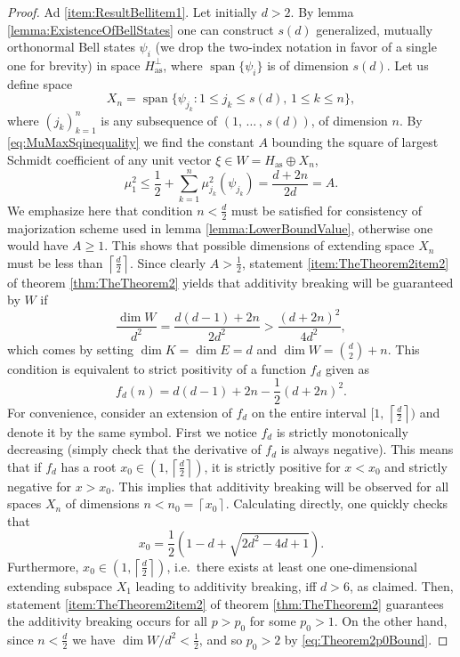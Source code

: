 \documentclass[reqno]{amsart}
\theoremstyle{plain}
\theoremstyle{note}
\newcommand{\ceil}[1]{\left\lceil #1 \right\rceil}
\newcommand{\aspace}{H_{\mathrm{as}}}
\newcommand{\Span}{\operatorname{span}}
\begin{document}
\begin{proof}
Ad \ref{item:ResultBellitem1}. Let initially $d > 2$. By lemma \ref{lemma:ExistenceOfBellStates} one can construct $s(d)$ generalized, mutually orthonormal Bell states $\psi_i$ (we drop the two-index notation in favor of a single one for brevity) in space $\aspace^\perp$, where $\Span{\{\psi_i\}}$ is of dimension $s(d)$. Let us define space
\begin{equation}
    X_n = \Span{\{\psi_{j_k} : 1 \leqslant j_k \leqslant s(d), \, 1 \leqslant k \leqslant n\}},
\end{equation}
where $(j_k)_{k=1}^{n}$ is any subsequence of $(1, \, \ldots \, , \, s(d))$, of dimension $n$. By \eqref{eq:MuMaxSqinequality} we find the constant $A$ bounding the square of largest Schmidt coefficient of any unit vector $\xi\in W = \aspace \oplus X_n$,
\begin{equation}
    \mu_{1}^{2} \leqslant \frac{1}{2} + \sum_{k=1}^{n} \mu_{j_{k}}^{2} (\psi_{j_{k}}) = \frac{d+2n}{2d} = A.
\end{equation}
We emphasize here that condition $n < \frac{d}{2}$ must be satisfied for consistency of majorization scheme used in lemma \ref{lemma:LowerBoundValue}, otherwise one would have $A \geqslant 1$. This shows that possible dimensions of extending space $X_n$ must be less than $\ceil{\frac{d}{2}}$. Since clearly $A > \frac{1}{2}$, statement \ref{item:TheTheorem2item2} of theorem \ref{thm:TheTheorem2} yields that additivity breaking will be guaranteed by $W$ if
\begin{equation}\label{eq:Bell}
    \frac{\dim{W}}{d^2} = \frac{d(d-1)+2n}{2d^2} > \frac{(d+2n)^2}{4d^2},
\end{equation}
which comes by setting $\dim{K}=\dim{E}=d$ and $\dim{W} = \binom{d}{2}+n$. This condition is equivalent to strict positivity of a function $f_{d}$ given as
\begin{equation}
    f_{d}(n) = d(d-1)+2n - \frac{1}{2}(d+2n)^{2}.
\end{equation}
For convenience, consider an extension of $f_{d}$ on the entire interval $[1, \, \ceil{\frac{d}{2}})$ and denote it by the same symbol. First we notice $f_{d}$ is strictly monotonically decreasing (simply check that the derivative of $f_d$ is always negative). This means that if $f_{d}$ has a root $x_0 \in (1, \ceil{\frac{d}{2}})$, it is strictly positive for $x < x_0$ and strictly negative for $x > x_0$. This implies that additivity breaking will be observed for all spaces $X_n$ of dimensions $n < n_0 = \ceil{x_0}$. Calculating directly, one quickly checks that
\begin{equation}
    x_0 = \frac{1}{2}\left(1-d+\sqrt{2d^2-4d+1}\right).
\end{equation}
Furthermore, $x_0 \in (1, \ceil{\frac{d}{2}})$, i.e.~there exists at least one one-dimensional extending subspace $X_1$ leading to additivity breaking, iff $d > 6$, as claimed. Then, statement \ref{item:TheTheorem2item2} of theorem \ref{thm:TheTheorem2} guarantees the additivity breaking occurs for all $p > p_0$ for some $p_0 > 1$. On the other hand, since $n < \frac{d}{2}$ we have $\dim{W}/d^2 < \frac{1}{2}$, and so $p_0 > 2$ by \eqref{eq:Theorem2p0Bound}.


\end{proof}
\end{document}
